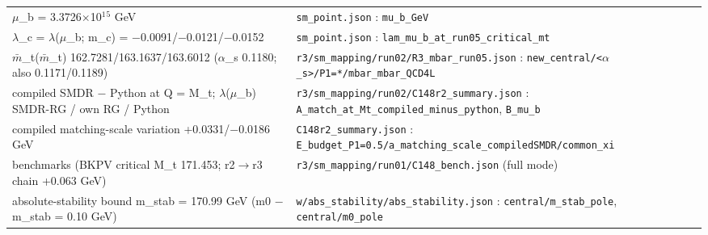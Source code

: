{\begin{longtable}{@{}>{\raggedright\arraybackslash}p{}>{\raggedright\arraybackslash}p{}@{}}
\ensuremath{\mu}\_\allowbreak{}b = 3.3726\ensuremath{\times}10\ensuremath{^1}\ensuremath{^5} GeV & \texttt{sm\_\allowbreak{}point.json} : \texttt{mu\_\allowbreak{}b\_\allowbreak{}GeV} \\
\ensuremath{\lambda}\_\allowbreak{}c = \ensuremath{\lambda}(\ensuremath{\mu}\_\allowbreak{}b; m\_\allowbreak{}c) = \ensuremath{-}0.0091/\allowbreak{}\ensuremath{-}0.0121/\allowbreak{}\ensuremath{-}0.0152 & \texttt{sm\_\allowbreak{}point.json} : \texttt{lam\_\allowbreak{}mu\_\allowbreak{}b\_\allowbreak{}at\_\allowbreak{}run05\_\allowbreak{}critical\_\allowbreak{}mt} \\
\ensuremath{\bar{m}}\_\allowbreak{}t(\ensuremath{\bar{m}}\_\allowbreak{}t) 162.7281/\allowbreak{}163.1637/\allowbreak{}163.6012 (\ensuremath{\alpha}\_\allowbreak{}s 0.1180; also 0.1171/\allowbreak{}0.1189) & \texttt{r3/\allowbreak{}sm\_\allowbreak{}mapping/\allowbreak{}run02/\allowbreak{}R3\_\allowbreak{}mbar\_\allowbreak{}run05.json} : \texttt{new\_\allowbreak{}central/\allowbreak{}<\ensuremath{\alpha}\_\allowbreak{}s>/\allowbreak{}P1=*/\allowbreak{}mbar\_\allowbreak{}mbar\_\allowbreak{}QCD4L} \\
compiled SMDR \ensuremath{-} Python at Q = M\_\allowbreak{}t; \ensuremath{\lambda}(\ensuremath{\mu}\_\allowbreak{}b) SMDR-RG /\allowbreak{} own RG /\allowbreak{} Python & \texttt{r3/\allowbreak{}sm\_\allowbreak{}mapping/\allowbreak{}run02/\allowbreak{}C148r2\_\allowbreak{}summary.json} : \texttt{A\_\allowbreak{}match\_\allowbreak{}at\_\allowbreak{}Mt\_\allowbreak{}compiled\_\allowbreak{}minus\_\allowbreak{}python}, \texttt{B\_\allowbreak{}mu\_\allowbreak{}b} \\
compiled matching-scale variation +0.0331/\allowbreak{}\ensuremath{-}0.0186 GeV & \texttt{C148r2\_\allowbreak{}summary.json} : \texttt{E\_\allowbreak{}budget\_\allowbreak{}P1=0.5/\allowbreak{}a\_\allowbreak{}matching\_\allowbreak{}scale\_\allowbreak{}compiledSMDR/\allowbreak{}common\_\allowbreak{}xi} \\
benchmarks (BKPV critical M\_\allowbreak{}t 171.453; r2\ensuremath{\to}r3 chain +0.063 GeV) & \texttt{r3/\allowbreak{}sm\_\allowbreak{}mapping/\allowbreak{}run01/\allowbreak{}C148\_\allowbreak{}bench.json} (full mode) \\
absolute-stability bound m\_\allowbreak{}stab = 170.99 GeV (m0 \ensuremath{-} m\_\allowbreak{}stab = 0.10 GeV) & \texttt{w/\allowbreak{}abs\_\allowbreak{}stability/\allowbreak{}abs\_\allowbreak{}stability.json} : \texttt{central/\allowbreak{}m\_\allowbreak{}stab\_\allowbreak{}pole}, \texttt{central/\allowbreak{}m0\_\allowbreak{}pole} \\

\end{longtable}}
